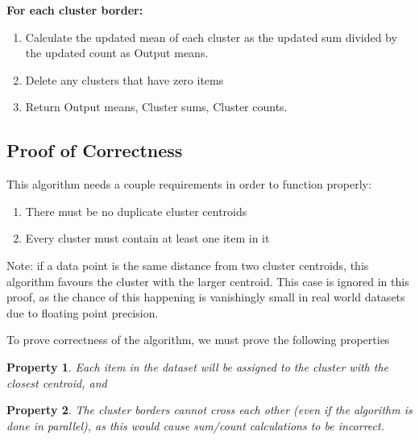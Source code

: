 \documentclass[conference,compsoc]{IEEEtran}
\newtheorem{prp}{Property}
\begin{document}
\textbf{For each cluster border:}
\begin{enumerate}
    \item Calculate the updated mean of each cluster as the updated sum divided by the updated count as Output means.
    \item Delete any clusters that have zero items
    \item Return Output means, Cluster sums, Cluster counts.
\end{enumerate}

\subsection{Proof of Correctness}

This algorithm needs a couple requirements in order to function properly:
\begin{enumerate}
    \item There must be no duplicate cluster centroids
    \item Every cluster must contain at least one item in it
\end{enumerate}

Note: if a data point is the same distance from two cluster centroids, this algorithm favours the cluster with the larger centroid.
This case is ignored in this proof, as the chance of this happening is vanishingly small in real world datasets due to floating point precision.

To prove correctness of the algorithm, we must prove the following properties
\begin{prp}\label{closest-centroid}Each item in the dataset will be assigned to the cluster with the closest centroid, and\end{prp}
\begin{prp}\label{border-cross}The cluster borders cannot cross each other (even if the algorithm is done in parallel), as this would cause sum/count calculations to be incorrect.\end{prp}
\end{document}
